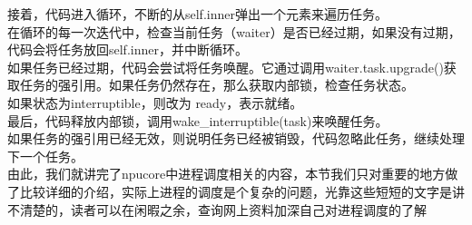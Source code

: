 接着，代码进入循环，不断的从self.inner弹出一个元素来遍历任务。\\
在循环的每一次迭代中，检查当前任务（waiter）是否已经过期，如果没有过期，代码会将任务放回self.inner，并中断循环。\\
如果任务已经过期，代码会尝试将任务唤醒。它通过调用waiter.task.upgrade()获取任务的强引用。如果任务仍然存在，那么获取内部锁，检查任务状态。\\
如果状态为interruptible，则改为 ready，表示就绪。\\
最后，代码释放内部锁，调用wake_interruptible(task)来唤醒任务。\\
如果任务的强引用已经无效，则说明任务已经被销毁，代码忽略此任务，继续处理下一个任务。
\\[10pt]

由此，我们就讲完了npucore中进程调度相关的内容，本节我们只对重要的地方做了比较详细的介绍，实际上进程的调度是个复杂的问题，光靠这些短短的文字是讲不清楚的，读者可以在闲暇之余，查询网上资料加深自己对进程调度的了解




